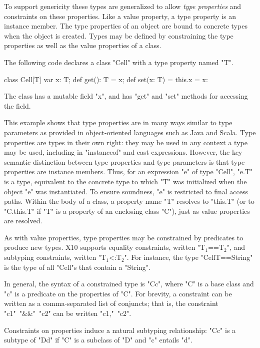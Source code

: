 \documentclass[preprint,nocopyrightspace,9pt]{sigplanconf}
\begin{document}
To support genericity these types are generalized
to allow \emph{type properties} and constraints on these properties.
Like a value property, a type property is an instance member.
The type properties of an object are bound to concrete types
when the object is
created.
Types may be defined by constraining the type properties as
well as the value properties of a class.

The following code declares a class \xcd"Cell" with a type
property named \xcd"T".
\begin{xten}
class Cell[T] {
    var x: T;
    def get(): T = x;
    def set(x: T) = { this.x = x: }
}
\end{xten}
The class has a mutable field \xcd"x",
and has \xcd"get" and \xcd"set" methods for accessing the field.

This example shows that type properties are in many ways similar to
type parameters as provided in object-oriented languages such as
Java and Scala.
Type properties are types in their own right:
they may be used in any context a type may be used,
including in \xcd"instanceof" and cast expressions.
However, the key semantic distinction between type properties
and type parameters is that type properties are instance
members.
Thus, for an expression \xcd"e" of type \xcd"Cell", \xcd"e.T" is
a type, equivalent to the concrete type to which \xcd"T" was
initialized when the object \xcd"e" was instantiated.
To ensure
soundness, \xcd"e" is restricted to final access paths.
Within the body of a class, a property name \xcd"T" resolves
to \xcd"this.T" (or to \xcd"C.this.T" if \xcd"T" is a property of
an enclosing class \xcd"C"), just as value properties are
resolved.

As with value properties, type properties may be constrained
by predicates to produce new types.
X10 supports
equality constraints, written \xcdmath"T$_1$==T$_2$", and
subtyping constraints, written \xcdmath"T$_1$<:T$_2$".
For instance, the type \xcd"Cell{T==String}" is the type of
all \xcd"Cell"s that contain a \xcd"String".

In general, the syntax of a constrained type is
\xcd"C{c}", where \xcd"C" is a base class and
\xcd"c" is a predicate on the properties of \xcd"C".
For brevity, a constraint can be written as
a comma-separated list of conjuncts; that is, the constraint
\xcd"c1"~\xcd"&&"~\xcd"c2" can be written
\xcd"c1,"~\xcd"c2".

Constraints on properties induce a natural subtyping relationship:
\xcd"C{c}" is a subtype of
\xcd"D{d}" if \xcd"C" is a subclass of \xcd"D" and
\xcd"c" entails \xcd"d".
\end{document}
